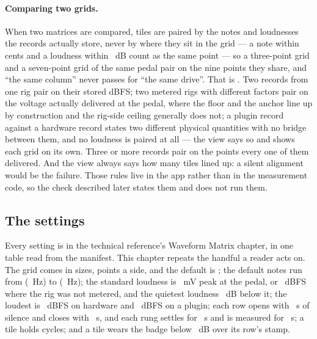 \documentclass[11pt,a4paper]{article}
\begin{document}
\paragraph{Comparing two grids.} When two matrices are compared, tiles
are paired by the notes and loudnesses the records actually store, never
by where they sit in the grid --- a note within \wmNoteToleranceCents{}
cents and a loudness within \wmLevelToleranceDB{}~dB count as the same
point --- so a three-point grid and a seven-point grid of the same pedal
pair on the nine points they share, and ``the same column'' never
passes for ``the same drive''. That is . Two
records from one rig pair on their stored dBFS; two metered rigs with
different factors pair on the voltage actually delivered at the pedal,
where the floor and the anchor line up by construction and the rig-side
ceiling generally does not; a plugin record against a hardware record
states two different physical quantities with no bridge between them,
and no loudness is paired at all --- the view says so and shows each grid
on its own. Three or more records pair on the points every one of them
delivered. And the view always says how many tiles lined up: a silent
alignment would be the failure. Those rules live in the app rather than
in the measurement code, so the check described later states them and
does not run them.

\subsection{The settings}

Every setting is in the technical reference's Waveform Matrix chapter,
in one table read from the manifest. This chapter repeats the handful a
reader acts on. The grid comes in \wmDimensionCount{} sizes,
\wmDimensions{} points a side, and the default is \wmDefaultDimension{};
the default notes run from \wmLowNote{} (\wmLowHz{}~Hz) to \wmHighNote{}
(\wmHighHz{}~Hz); the standard loudness is \wmAnchorMillivolts{}~mV peak
at the pedal, or \wmNoVoltsAnchorDBFS{}~dBFS where the rig was not
metered, and the quietest loudness \wmFloorSpanDB{}~dB below it; the
loudest is \wmCeilingDBFS{}~dBFS on hardware and
\wmPluginCeilingDBFS{}~dBFS on a plugin; each row opens with
\wmPrerollS{}~s of silence and closes with \wmTailS{}~s, and each rung
settles for \wmSettleS{}~s and is measured for \wmMeasureS{}~s; a tile
holds \wmPeriodCount{} cycles; and a tile wears the badge below
\wmClearMarginDB{}~dB over its row's stamp.
\end{document}
